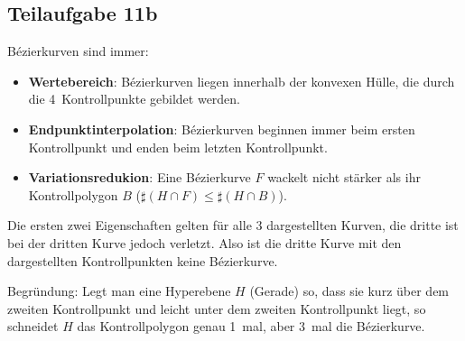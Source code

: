 \documentclass[a4paper]{scrartcl}
\begin{document}
\subsection*{Teilaufgabe 11b}
Bézierkurven sind immer:

\begin{itemize}
    \item \textbf{Wertebereich}: Bézierkurven liegen innerhalb der konvexen
          Hülle, die durch die 4~Kontrollpunkte gebildet werden.
    \item \textbf{Endpunktinterpolation}: Bézierkurven beginnen immer beim
          ersten Kontrollpunkt und enden beim letzten Kontrollpunkt.
    \item \textbf{Variationsredukion}: Eine Bézierkurve $F$ wackelt nicht stärker
          als ihr Kontrollpolygon $B$ ($\sharp (H \cap F) \leq \sharp (H \cap B)$).
\end{itemize}

Die ersten zwei Eigenschaften gelten für alle 3 dargestellten Kurven, die
dritte ist bei der dritten Kurve jedoch verletzt. Also ist die dritte Kurve
mit den dargestellten Kontrollpunkten keine Bézierkurve.

Begründung: Legt man eine Hyperebene $H$ (Gerade) so, dass sie kurz über dem
zweiten Kontrollpunkt und leicht unter dem zweiten Kontrollpunkt liegt, so
schneidet $H$ das Kontrollpolygon genau 1~mal, aber 3~mal die Bézierkurve.
\end{document}
